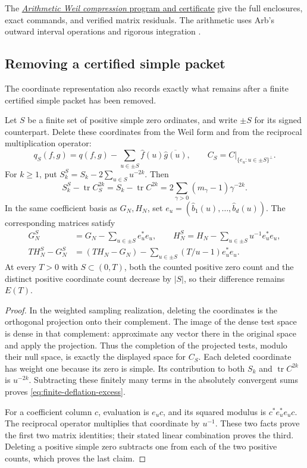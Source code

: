 The \href{\workbenchurl}{\emph{Arithmetic Weil compression}
program and certificate} give the full enclosures, exact
commands, and verified matrix residuals. The arithmetic uses
Arb's outward interval operations and rigorous integration
\cite{Johansson2017arb,Johansson2018integration}.


\subsection{Removing a certified simple packet}
The coordinate representation also records exactly what remains
after a finite certified simple packet has been removed.

\begin{proposition}\label{prop:finite-simple-deflation}
Let $S$ be a finite set of positive simple zero ordinates, and
write $\pm S$ for its signed counterpart. Delete these coordinates
from the Weil form and from the reciprocal multiplication operator:
\[
 q_S(f,g)=q(f,g)-\sum_{u\in\pm S}
                  \widehat f(u)\overline{\widehat g(u)},
 \qquad C_S=C|_{\{e_u:u\in\pm S\}^{\perp}}.
\]
For $k\ge1$, put $S_k^S=S_k-2\sum_{u\in S}u^{-2k}$. Then
\begin{equation}\label{eq:finite-deflation-excess}
 S_k^S-\operatorname{tr}C_S^{2k}
 =S_k-\operatorname{tr}C^{2k}
 =2\sum_{\gamma>0}(m_\gamma-1)\gamma^{-2k}.
\end{equation}
In the same coefficient basis as $G_N,H_N$, set
$e_u=(\widehat b_1(u),\ldots,\widehat b_d(u))$. The corresponding
matrices satisfy
\begin{align*}
 G_N^S&=G_N-\sum_{u\in\pm S}e_u^*e_u,\qquad
 H_N^S=H_N-\sum_{u\in\pm S}u^{-1}e_u^*e_u,\\
 TH_N^S-G_N^S
   &=(TH_N-G_N)-\sum_{u\in\pm S}(T/u-1)e_u^*e_u.
\end{align*}
At every $T>0$ with $S\subset(0,T)$, both the counted positive zero count and the
distinct positive coordinate count decrease by $|S|$, so their
difference remains $E(T)$.
\end{proposition}

\begin{proof}
In the weighted sampling realization, deleting the coordinates is
the orthogonal projection onto their complement. The image of the
dense test space is dense in that complement: approximate any vector
there in the original space and apply the projection. Thus the
completion of the projected tests, modulo their null space, is
exactly the displayed space for $C_S$. Each deleted coordinate has
weight one because its zero is simple. Its contribution to both
$S_k$ and $\operatorname{tr}C^{2k}$ is $u^{-2k}$. Subtracting
these finitely many terms in the absolutely convergent sums proves
\eqref{eq:finite-deflation-excess}.

For a coefficient column $c$, evaluation is $e_uc$, and its
squared modulus is $c^*e_u^*e_uc$. The reciprocal operator
multiplies that coordinate by $u^{-1}$. These two facts prove
the first two matrix identities; their stated linear combination
proves the third. Deleting a positive simple zero subtracts one
from each of the two positive counts, which proves the last claim.
\end{proof}

